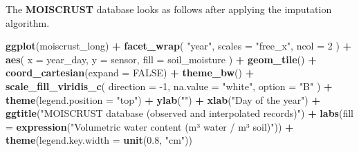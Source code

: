 \documentclass[]{article}
\newenvironment{Shaded}{\begin{snugshade}}{\end{snugshade}}
\newcommand{\DataTypeTok}[1]{\textcolor[rgb]{0.13,0.29,0.53}{#1}}
\newcommand{\DecValTok}[1]{\textcolor[rgb]{0.00,0.00,0.81}{#1}}
\newcommand{\FloatTok}[1]{\textcolor[rgb]{0.00,0.00,0.81}{#1}}
\newcommand{\KeywordTok}[1]{\textcolor[rgb]{0.13,0.29,0.53}{\textbf{#1}}}
\newcommand{\NormalTok}[1]{#1}
\newcommand{\OperatorTok}[1]{\textcolor[rgb]{0.81,0.36,0.00}{\textbf{#1}}}
\newcommand{\OtherTok}[1]{\textcolor[rgb]{0.56,0.35,0.01}{#1}}
\newcommand{\StringTok}[1]{\textcolor[rgb]{0.31,0.60,0.02}{#1}}
\begin{document}
The \textbf{MOISCRUST} database looks as follows after applying the
imputation algorithm.

\begin{Shaded}
\begin{Highlighting}[]
\KeywordTok{ggplot}\NormalTok{(moiscrust_long) }\OperatorTok{+}\StringTok{ }
\StringTok{  }\KeywordTok{facet_wrap}\NormalTok{(}
    \StringTok{"year"}\NormalTok{, }
    \DataTypeTok{scales =} \StringTok{"free_x"}\NormalTok{, }
    \DataTypeTok{ncol =} \DecValTok{2}
\NormalTok{    ) }\OperatorTok{+}
\StringTok{  }\KeywordTok{aes}\NormalTok{(}
    \DataTypeTok{x =}\NormalTok{ year_day, }
    \DataTypeTok{y =}\NormalTok{ sensor, }
    \DataTypeTok{fill =}\NormalTok{ soil_moisture}
\NormalTok{    ) }\OperatorTok{+}\StringTok{ }
\StringTok{  }\KeywordTok{geom_tile}\NormalTok{() }\OperatorTok{+}\StringTok{ }
\StringTok{  }\KeywordTok{coord_cartesian}\NormalTok{(}\DataTypeTok{expand =} \OtherTok{FALSE}\NormalTok{) }\OperatorTok{+}
\StringTok{  }\KeywordTok{theme_bw}\NormalTok{() }\OperatorTok{+}\StringTok{ }
\StringTok{  }\KeywordTok{scale_fill_viridis_c}\NormalTok{(}
    \DataTypeTok{direction =} \DecValTok{-1}\NormalTok{, }
    \DataTypeTok{na.value =} \StringTok{"white"}\NormalTok{, }
    \DataTypeTok{option =} \StringTok{"B"}
\NormalTok{    ) }\OperatorTok{+}
\StringTok{  }\KeywordTok{theme}\NormalTok{(}\DataTypeTok{legend.position =} \StringTok{"top"}\NormalTok{) }\OperatorTok{+}\StringTok{ }
\StringTok{  }\KeywordTok{ylab}\NormalTok{(}\StringTok{""}\NormalTok{) }\OperatorTok{+}\StringTok{ }
\StringTok{  }\KeywordTok{xlab}\NormalTok{(}\StringTok{"Day of the year"}\NormalTok{) }\OperatorTok{+}
\StringTok{  }\KeywordTok{ggtitle}\NormalTok{(}\StringTok{"MOISCRUST database (observed and interpolated records)"}\NormalTok{) }\OperatorTok{+}
\StringTok{  }\KeywordTok{labs}\NormalTok{(}\DataTypeTok{fill =} \KeywordTok{expression}\NormalTok{(}\StringTok{"Volumetric water content (m³ water / m³ soil)"}\NormalTok{)) }\OperatorTok{+}\StringTok{ }
\StringTok{  }\KeywordTok{theme}\NormalTok{(}\DataTypeTok{legend.key.width =} \KeywordTok{unit}\NormalTok{(}\FloatTok{0.8}\NormalTok{, }\StringTok{"cm"}\NormalTok{))}
\end{Highlighting}
\end{Shaded}
\end{document}
